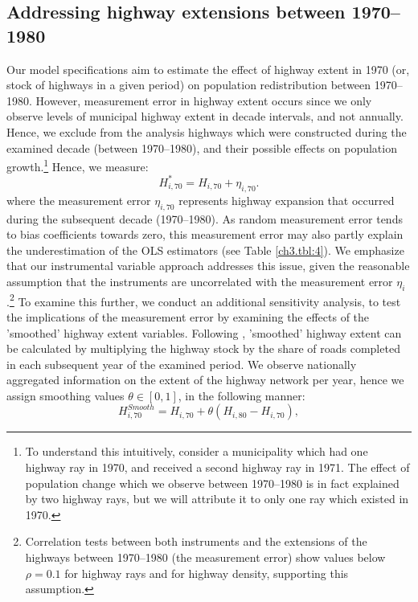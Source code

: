 \documentclass[a4paper,authoryear,review]{elsarticle}  	%
\begin{document}
\subsection{Addressing highway extensions between 1970--1980}\label{sec:measure.err}
	Our model specifications aim to estimate the effect of highway extent in 1970 (or, stock of highways in a given period) on population redistribution between 1970--1980. However, measurement error in highway extent occurs since we only observe levels of municipal highway extent in decade intervals, and not annually. Hence, we exclude from the analysis highways which were constructed during the examined decade (between 1970--1980), and their possible effects on population growth.\footnote{To understand this intuitively, consider a municipality which had one highway ray in 1970, and received a second highway ray in 1971. The effect of population change which we observe between 1970--1980 is in fact explained by two highway rays, but we will attribute it to only one ray which existed in 1970.} Hence, we measure:\\	
	\begin{equation*}
		H^{*}_{i,70} = H_{i,70} + \eta_{i,70}.	
	\end{equation*}
	where the measurement error $\eta_{i,70}$ represents highway expansion that occurred during the subsequent decade (1970--1980). As random measurement error tends to bias coefficients towards zero, this measurement error may also partly explain the underestimation of the OLS estimators (see Table \ref{ch3.tbl:4}). 
	We emphasize that our instrumental variable approach addresses this issue, given the reasonable assumption that the instruments are uncorrelated with the measurement error $\eta_{i}$ \citep{Hausman2001x}.\footnote{Correlation tests between both instruments and the extensions of the highways between 1970--1980 (the measurement error) show values below $\rho=0.1$ for highway rays and for highway density, supporting this assumption.}		
	To examine this further, we conduct an additional sensitivity analysis, to test the implications of the measurement error by examining the effects of the 'smoothed' highway extent variables. Following \citet{Baum-Snow2007}, 'smoothed' highway extent can be calculated by multiplying the highway stock by the share of roads completed in each subsequent year of the examined period. We observe nationally aggregated information on the extent of the highway network per year, hence we assign smoothing values $\theta \in [0,1]$, in the following manner:		
	\begin{equation}\label{ch3.eq:smooth}		
		H^{Smooth}_{i,70} = H_{i,70} + \theta (H_{i,80}-H_{i,70}), 
	\end{equation}
\end{document}
